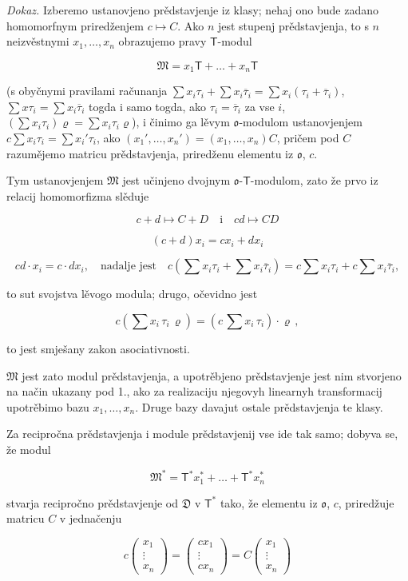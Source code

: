 \documentclass[11pt]{article}
\begin{document}
\emph{Dokaz.} Izberemo ustanovjeno prědstavjenje iz klasy; nehaj ono bude zadano homomorfnym priredženjem \(c\mapsto C\). Ako \(n\) jest stupenj prědstavjenja, to s \(n\) neizvěstnymi \(x_1,\ldots,x_n\) obrazujemo pravy \(\mathsf T\)-modul

\[\mathfrak{M} = x_1 \mathsf{T} + \dots + x_n \mathsf{T}\]

(s obyčnymi pravilami računanja \(\sum x_i\tau_i+\sum x_i\overline{\tau}_i=\sum x_i(\tau_i+\overline{\tau}_i)\), \(\sum x\tau_i=\sum x_i\overline{\tau}_i\) togda i samo togda, ako \(\tau_i=\overline{\tau}_i\) za vse \(i\), \((\sum x_i\tau_i)\varrho=\sum x_i\tau_i\varrho\)), i činimo ga lěvym \(\mathfrak{o}\)-modulom ustanovjenjem \(c\sum x_i\tau_i=\sum x_i'\tau_i\), ako \((x_1',\ldots,x_n')=(x_1,\ldots,x_n)C\), pričem pod \(C\) razumějemo matricu prědstavjenja, priredženu elementu iz \(\mathfrak{o}\), \(c\).

Tym ustanovjenjem \(\mathfrak M\) jest učinjeno dvojnym \(\mathfrak{o}\)-\(\mathsf T\)-modulom, zato že prvo iz relacij homomorfizma slěduje

\[
c+d\mapsto C+D \quad \text{i} \quad cd\mapsto CD
\]

\[
(c+d)x_i=cx_i+dx_i
\]

\[
cd\cdot x_i=c\cdot dx_i,\quad\text{nadalje jest}\quad
c\left(\sum x_i\tau_i+\sum x_i\overline{\tau}_i\right)
=c\sum x_i\tau_i+c\sum x_i\overline{\tau}_i,
\]

to sut svojstva lěvogo modula; drugo, očevidno jest

\[c(\sum x_i \, \tau_i \, \varrho) = (c \, \sum x_i \, \tau_i) \cdot \varrho \,,\]

to jest smješany zakon asociativnosti.

\(\mathfrak{M}\) jest zato modul prědstavjenja, a upotrěbjeno prědstavjenje jest nim stvorjeno na način ukazany pod 1., ako za realizaciju njegovyh linearnyh transformacij upotrěbimo bazu \(x_1, \ldots, x_n\). Druge bazy davajut ostale prědstavjenja te klasy.

Za recipročna prědstavjenja i module prědstavjenij vse ide tak samo; dobyva se, že modul

\[\mathfrak{M}^* = \mathsf{T}^* x_1^* + \dots + \mathsf{T}^* x_n^*\]

stvarja recipročno prědstavjenje od \(\mathfrak D\) v \(\mathsf T^*\) tako, že elementu iz \(\mathfrak{o}\), \(c\), priredžuje matricu \(C\) v jednačenju

\[
c\begin{pmatrix}x_1\\ \vdots\\ x_n\end{pmatrix}
=\begin{pmatrix}cx_1\\ \vdots\\ cx_n\end{pmatrix}
=C\begin{pmatrix}x_1\\ \vdots\\ x_n\end{pmatrix}
\]
\end{document}
